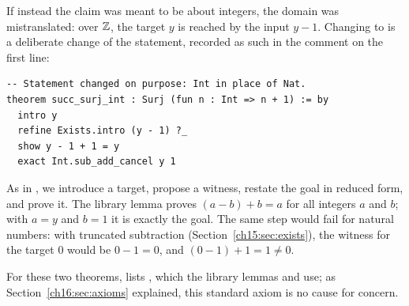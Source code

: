 If instead the claim was meant to be about integers, the domain was mistranslated: over $\mathbb Z$, the target $y$ is reached by the input $y-1$. Changing  to  is a deliberate change of the statement, recorded as such in the comment on the first line:
\par\noindent\begin{minipage}{\linewidth}
\begin{lstlisting}
-- Statement changed on purpose: Int in place of Nat.
theorem succ_surj_int : Surj (fun n : Int => n + 1) := by
  intro y
  refine Exists.intro (y - 1) ?_
  show y - 1 + 1 = y
  exact Int.sub_add_cancel y 1
\end{lstlisting}
\end{minipage}\par
As in , we introduce a target, propose a witness, restate the goal in reduced form, and prove it. The library lemma  proves $(a-b)+b=a$ for all integers $a$ and $b$; with $a=y$ and $b=1$ it is exactly the goal. The same step would fail for natural numbers: with truncated subtraction (Section~\ref{ch15:sec:exists}), the witness for the target $0$ would be $0-1=0$, and $(0-1)+1=1\ne0$.

For these two theorems,  lists , which the library lemmas  and  use; as Section~\ref{ch16:sec:axioms} explained, this standard axiom is no cause for concern.
